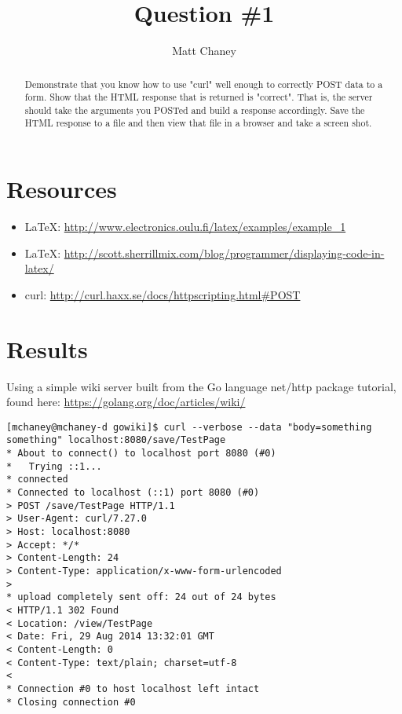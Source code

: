 \documentclass[10pt,letterpaper]{article}
\begin{document}
\title{Question \#1}
\author{Matt Chaney}

\maketitle

\begin{abstract}
Demonstrate that you know how to use "curl" well enough to
correctly POST data to a form.  Show that the HTML response that
is returned is "correct".  That is, the server should take the
arguments you POSTed and build a response accordingly.  Save the
HTML response to a file and then view that file in a browser and
take a screen shot.
\end{abstract}

\section{Resources}
\begin{itemize}
\item \LaTeX: \url{http://www.electronics.oulu.fi/latex/examples/example_1}
\item \LaTeX: \url{http://scott.sherrillmix.com/blog/programmer/displaying-code-in-latex/}
\item curl: \url{http://curl.haxx.se/docs/httpscripting.html#POST}
\end{itemize}

\section{Results}
Using a simple wiki server built from the Go language net/http package tutorial, found here: \url{https://golang.org/doc/articles/wiki/}
\begin{verbatim}
[mchaney@mchaney-d gowiki]$ curl --verbose --data "body=something something" localhost:8080/save/TestPage
* About to connect() to localhost port 8080 (#0)
*   Trying ::1...
* connected
* Connected to localhost (::1) port 8080 (#0)
> POST /save/TestPage HTTP/1.1
> User-Agent: curl/7.27.0
> Host: localhost:8080
> Accept: */*
> Content-Length: 24
> Content-Type: application/x-www-form-urlencoded
> 
* upload completely sent off: 24 out of 24 bytes
< HTTP/1.1 302 Found
< Location: /view/TestPage
< Date: Fri, 29 Aug 2014 13:32:01 GMT
< Content-Length: 0
< Content-Type: text/plain; charset=utf-8
< 
* Connection #0 to host localhost left intact
* Closing connection #0
\end{verbatim}
\end{document}
